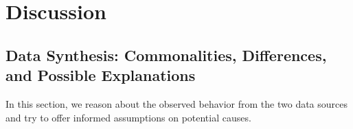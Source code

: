 \section{Discussion}
\label{sec:discussion}


\subsection{Data Synthesis: Commonalities, Differences, and Possible Explanations}
\label{subsec:data-synthesis:-commonalities-differences-and-possible-explanations}
In this section, we reason about the observed behavior from the two data sources and try to offer
informed assumptions on potential causes.

